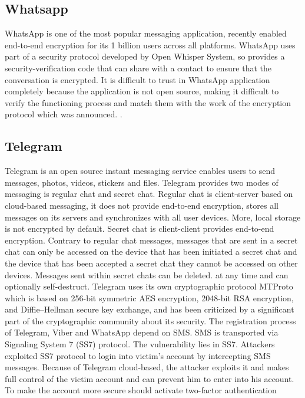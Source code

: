 \subsection{Whatsapp}
WhatsApp is one of the most popular messaging application, recently enabled end-to-end encryption for its 1 billion users across all platforms. WhatsApp uses part of a security protocol developed by Open Whisper System, so provides a security-verification code that can share with a contact to ensure that the conversation is encrypted. It is difficult to trust in WhatsApp application completely because the application is not open source, making it difficult to verify the functioning process and match them with the work of the encryption protocol which was announced. .\cite{e2echat}

\subsection{Telegram}
Telegram is an open source instant messaging service enables users to send messages, photos, videos, stickers and files. Telegram provides two modes of messaging
is regular chat and secret chat. Regular chat is client-server based on cloud-based messaging, it does not provide end-to-end encryption, stores all messages on its
servers and synchronizes with all user devices. More, local storage is not encrypted by default. Secret chat is client-client provides end-to-end encryption. Contrary to regular chat messages, messages that are sent in a secret chat can only be accessed on the device that has been initiated a secret chat and the device that has been accepted a secret chat they cannot be accessed on other devices. Messages sent within secret chats can be deleted.\cite{de}
at any time and can optionally self-destruct. Telegram uses its own cryptographic protocol MTProto which is based on 256-bit symmetric AES encryption, 2048-bit RSA encryption, and Diffie–Hellman secure key exchange, and has been criticized by a significant part of the cryptographic community about its security. The registration process of Telegram, Viber and WhatsApp depend on SMS. SMS is transported via Signaling System 7 (SS7) protocol. The vulnerability lies in SS7. Attackers exploited SS7 protocol to login into
victim's account by intercepting SMS messages. Because of Telegram cloud-based, the attacker exploits it and makes full control of the victim account and can prevent him to enter into his account. To make the account more secure should activate two-factor authentication \cite{telegram}

